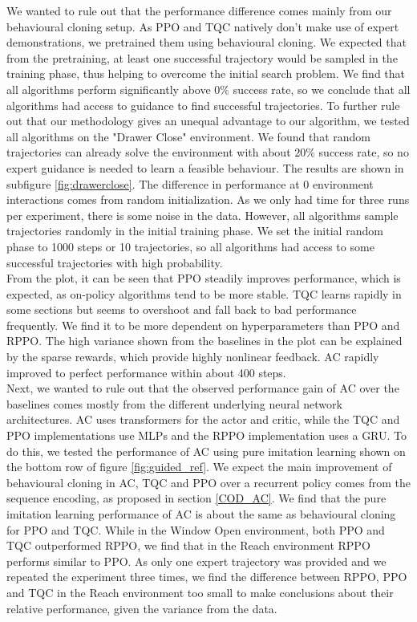 We wanted to rule out that the performance difference comes mainly from our behavioural cloning setup. As PPO and TQC natively don't make use of expert demonstrations,
we pretrained them using behavioural cloning. We expected that from the pretraining, at least one successful trajectory would be sampled in the training phase, thus
helping to overcome the initial search problem. We find that all algorithms perform significantly above $0\%$ success rate, so we conclude that all algorithms had
access to guidance to find successful trajectories. To further rule out that our methodology gives an unequal advantage to our algorithm, we tested all algorithms on the
"Drawer Close" environment. We found that random trajectories can already solve the environment with about $20\%$ success rate, so no expert guidance is needed to learn a feasible behaviour.
The results are shown in subfigure \ref{fig:drawerclose}. The difference in performance at 0 environment interactions comes from random initialization. As we only had time for three runs per
experiment, there is some noise in the data. However, all algorithms sample trajectories randomly in the initial training phase. We set the initial random phase to
1000 steps or 10 trajectories, so all algorithms had access to some successful trajectories with high probability. \\

From the plot, it can be seen that PPO steadily improves performance, which is expected, as on-policy algorithms tend to be more stable.
TQC learns rapidly in some sections but seems to overshoot and fall back to bad performance frequently.
We find it to be more dependent on hyperparameters than PPO and RPPO.
The high variance shown from the baselines in the plot can be explained by the sparse rewards, which provide highly nonlinear feedback.
AC rapidly improved to perfect performance within about 400 steps. \\

Next, we wanted to rule out that the observed performance gain of AC over the baselines comes mostly from the different underlying neural network architectures. AC uses transformers for the actor and
critic, while the TQC and PPO implementations use MLPs and the RPPO implementation uses a GRU. To do this, we tested the performance of AC using pure imitation learning shown on the bottom row of
figure \ref{fig:guided_ref}. We expect the main improvement of behavioural cloning in AC, TQC and PPO over a recurrent policy comes from the sequence encoding, as proposed in section \ref{COD_AC}.
We find that the pure imitation learning performance
of AC is about the same as behavioural cloning for PPO and TQC. While in the Window Open environment, both PPO and TQC outperformed RPPO, we find that in the Reach environment RPPO performs
similar to PPO. As only one expert trajectory was provided and we repeated the experiment three times, we find the difference between RPPO, PPO and TQC in the Reach
environment too small to make conclusions about their relative performance, given the variance from the data. \\

